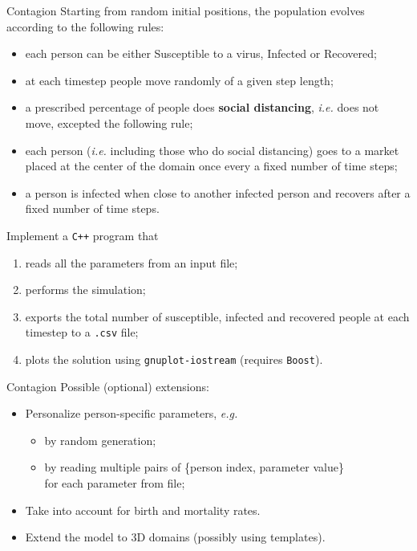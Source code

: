 \documentclass[10pt]{beamer}
\begin{document}
\begin{frame}{Contagion}
Starting from random initial positions, the population evolves according to the following rules:

\begin{itemize}
    \item each person can be either Susceptible to a virus, Infected or Recovered;
    \item at each timestep people move randomly of a given step length;
    \item a prescribed percentage of people does \textbf{social distancing}, \textit{i.e.} does not move, excepted the following rule;
    \item each person (\textit{i.e.} including those who do social distancing) goes to a market placed at the center of the domain once every a fixed number of time steps;
    \item a person is infected when close to another infected person and recovers after a fixed number of time steps.
\end{itemize}
\pause
Implement a \texttt{C++} program that
\begin{enumerate}
    \item reads all the parameters from an input file;
    \item performs the simulation;
    \item exports the total number of susceptible, infected and recovered people at each timestep to a \texttt{.csv} file;
    \item plots the solution using \texttt{gnuplot-iostream} (requires \texttt{Boost}).
\end{enumerate}
\end{frame}

\begin{frame}{Contagion}
Possible (optional) extensions:
\begin{itemize}
    \item Personalize person-specific parameters, \textit{e.g.}
    \begin{itemize}
        \item by random generation;
        \item by reading multiple pairs of \{person index, parameter value\}\\
              for each parameter from file;
    \end{itemize}
    \item Take into account for birth and mortality rates.
    \item Extend the model to 3D domains (possibly using templates).
\end{itemize}
\end{frame}
\end{document}

